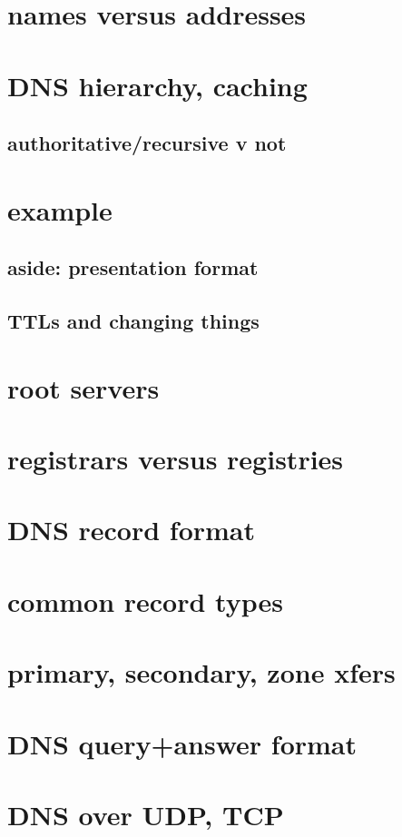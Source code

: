 
\section{names versus addresses}


\section{DNS hierarchy, caching}




\subsection{authoritative/recursive v not}


\section{example}


\subsection{aside: presentation format}


\subsection{TTLs and changing things}



\section{root servers}


\section{registrars versus registries}


\section{DNS record format}


\section{common record types}


\section{primary, secondary, zone xfers}

\section{DNS query+answer format}


\section{DNS over UDP, TCP}

